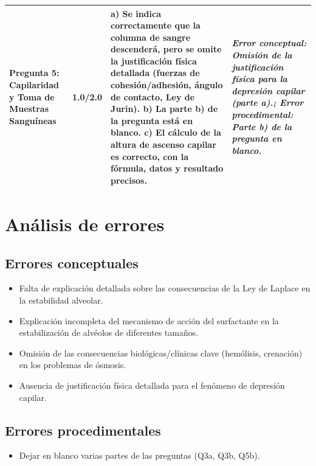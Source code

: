 \documentclass[11pt,a4paper]{article}
\begin{document}
\begin{longtable}{>{\bfseries}p{2.8cm} p{1.6cm} p{7.0cm} p{2.8cm}}
    \midrule
    \textbf{Pregunta 5: Capilaridad y Toma de Muestras Sanguíneas} & 1.0/2.0 & a) Se indica correctamente que la columna de sangre descenderá, pero se omite la justificación física detallada (fuerzas de cohesión/adhesión, ángulo de contacto, Ley de Jurin). b) La parte b) de la pregunta está en blanco. c) El cálculo de la altura de ascenso capilar es correcto, con la fórmula, datos y resultado precisos. & \textit{Error conceptual: Omisión de la justificación física para la depresión capilar (parte a).; Error procedimental: Parte b) de la pregunta en blanco.} \\
    \midrule
\end{longtable}

\section*{Análisis de errores}

\subsection*{Errores conceptuales}
\begin{itemize}[leftmargin=1.5em, itemsep=2pt]
  \item Falta de explicación detallada sobre las consecuencias de la Ley de Laplace en la estabilidad alveolar.
  \item Explicación incompleta del mecanismo de acción del surfactante en la estabilización de alvéolos de diferentes tamaños.
  \item Omisión de las consecuencias biológicas/clínicas clave (hemólisis, crenación) en los problemas de ósmosis.
  \item Ausencia de justificación física detallada para el fenómeno de depresión capilar.
\end{itemize}

\subsection*{Errores procedimentales}
\begin{itemize}[leftmargin=1.5em, itemsep=2pt]
  \item Dejar en blanco varias partes de las preguntas (Q3a, Q3b, Q5b).
\end{itemize}

\end{document}

